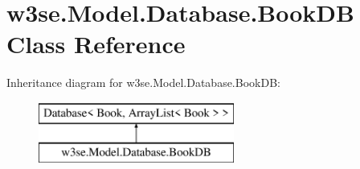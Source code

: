 \hypertarget{classw3se_1_1_model_1_1_database_1_1_book_d_b}{\section{w3se.\-Model.\-Database.\-Book\-D\-B Class Reference}
\label{classw3se_1_1_model_1_1_database_1_1_book_d_b}
}
Inheritance diagram for w3se.\-Model.\-Database.\-Book\-D\-B\-:\begin{figure}[H]
\begin{center}
\leavevmode
\includegraphics[height=2.000000cm]{classw3se_1_1_model_1_1_database_1_1_book_d_b}
\end{center}
\end{figure}
